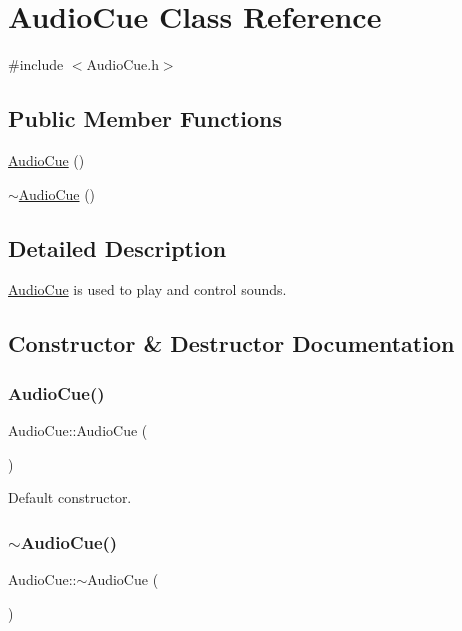 \hypertarget{class_audio_cue}{}\section{Audio\+Cue Class Reference}
\label{class_audio_cue}


{\ttfamily \#include $<$Audio\+Cue.\+h$>$}

\subsection*{Public Member Functions}
\begin{DoxyCompactItemize}
\item 
\mbox{\hyperlink{class_audio_cue_a5a28ab84a790e98e67fc433b117fb71d}{Audio\+Cue}} ()
\item 
\mbox{\hyperlink{class_audio_cue_a0055a983611df3b4581fe88bcb3c7505}{$\sim$\+Audio\+Cue}} ()
\end{DoxyCompactItemize}


\subsection{Detailed Description}
\mbox{\hyperlink{class_audio_cue}{Audio\+Cue}} is used to play and control sounds. 

\subsection{Constructor \& Destructor Documentation}
\mbox{\label{class_audio_cue_a5a28ab84a790e98e67fc433b117fb71d}} 
\subsubsection{\texorpdfstring{Audio\+Cue()}{AudioCue()}}
{\footnotesize\ttfamily Audio\+Cue\+::\+Audio\+Cue (\begin{DoxyParamCaption}{ }\end{DoxyParamCaption})}

Default constructor. \mbox{\label{class_audio_cue_a0055a983611df3b4581fe88bcb3c7505}} 
\subsubsection{\texorpdfstring{$\sim$\+Audio\+Cue()}{~AudioCue()}}
{\footnotesize\ttfamily Audio\+Cue\+::$\sim$\+Audio\+Cue (\begin{DoxyParamCaption}{ }\end{DoxyParamCaption})}


